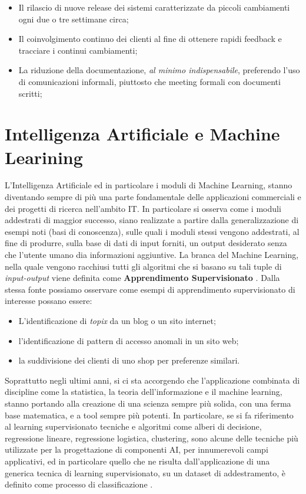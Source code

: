 \begin{itemize}
    \item Il rilascio di nuove release dei sistemi caratterizzate da piccoli cambiamenti ogni due o tre settimane circa; 
    \item Il coinvolgimento continuo dei clienti al fine di ottenere rapidi feedback e tracciare i continui cambiamenti;
    \item La riduzione della  documentazione, \emph{al minimo indispensabile}, preferendo l'uso di comunicazioni informali, piuttosto che meeting formali con documenti scritti;
    
\end{itemize}
\section{Intelligenza Artificiale e Machine Learining}
L'Intelligenza Artificiale ed in particolare i moduli di Machine Learning, stanno diventando sempre di più una parte fondamentale delle applicazioni commerciali e dei progetti di ricerca nell'ambito IT. In particolare si osserva come i moduli addestrati di maggior successo, siano realizzate a partire dalla generalizzazione di esempi noti (basi di conoscenza), sulle quali i moduli stessi vengono addestrati, al fine di produrre, sulla base di dati di input forniti, un output desiderato senza che l'utente umano dia informazioni aggiuntive. La branca del Machine Learning, nella quale vengono racchiusi tutti gli algoritmi che si basano su tali tuple di \textit{input-output} viene definita come \textbf{Apprendimento Supervisionato} \cite{libroMLs}.
Dalla stessa fonte possiamo osservare come esempi di apprendimento supervisionato di interesse possano essere:
\begin{itemize}
    \item L'identificazione di \textit{topix} da un blog o un sito internet;
    \item l'identificazione di pattern di accesso anomali in un sito web;
    \item la suddivisione dei clienti di uno shop per preferenze similari.
\end{itemize}

Soprattutto negli ultimi anni, si ci sta accorgendo che l'applicazione combinata di discipline come la statistica, la teoria dell'informazione e il machine learning, stanno portando alla creazione di una scienza sempre più solida, con una ferma base matematica, e a tool sempre più potenti. In particolare, se si fa riferimento al learning supervisionato tecniche e algoritmi come alberi di decisione, regressione lineare, regressione logistica, clustering, sono alcune delle tecniche più utilizzate per la progettazione di componenti AI, per innumerevoli campi applicativi, ed in particolare quello che ne risulta dall'applicazione di una generica tecnica di learning supervisionato, su un dataset di addestramento, è definito come processo di classificazione \cite{supervisedML&Classification}. \\

